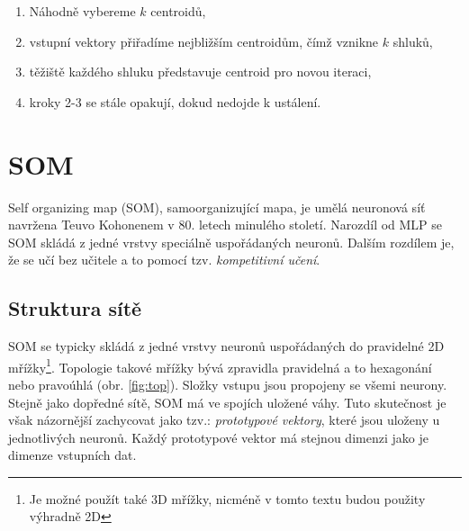 \documentclass[thesis=M,czech]{FITthesis}[2012/06/26]
\begin{document}
\begin{enumerate}
\item Náhodně vybereme $k$ centroidů,
\item  vstupní vektory přiřadíme nejbližším centroidům, čímž vznikne $k$ shluků,
\item těžiště každého shluku představuje centroid pro novou iteraci,
\item kroky 2-3 se stále opakují, dokud nedojde k ustálení.
\end{enumerate}


\section{SOM}\label{sec:som_teo}
Self organizing map (SOM), samoorganizující mapa, je umělá neuronová síť navržena Teuvo Kohonenem v 80. letech minulého století. Narozdíl od MLP se SOM skládá z jedné vrstvy speciálně uspořádaných neuronů. Dalším rozdílem je, že se učí bez učitele a to pomocí tzv. \textit{kompetitivní učení}.\cite{junkie}

\subsection{Struktura sítě}
SOM se typicky skládá z jedné vrstvy neuronů uspořádaných do pravidelné 2D mřížky\footnote{Je možné použít také 3D mřížky, nicméně v tomto textu budou použity výhradně 2D}. Topologie takové mřížky bývá zpravidla pravidelná a to hexagonání nebo pravoúhlá (obr. \ref{fig:top}). Složky vstupu jsou propojeny se všemi neurony.
Stejně jako dopředné sítě, SOM má ve spojích uložené váhy. Tuto skutečnost je však názornější zachycovat jako tzv.: \textit{prototypové vektory}, které jsou uloženy u jednotlivých neuronů. Každý prototypové vektor  má stejnou dimenzi jako je dimenze vstupních dat.
\end{document}
